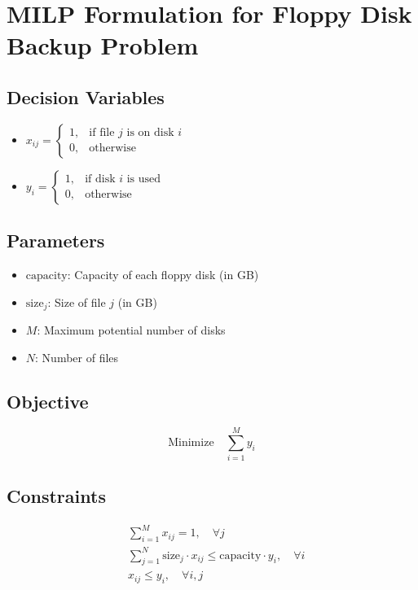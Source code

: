 \documentclass{article}
\begin{document}
\section*{MILP Formulation for Floppy Disk Backup Problem}

\subsection*{Decision Variables}
\begin{itemize}
    \item $x_{ij} = 
    \begin{cases} 
    1, & \text{if file } j \text{ is on disk } i \\
    0, & \text{otherwise}
    \end{cases}$
    
    \item $y_i =
    \begin{cases} 
    1, & \text{if disk } i \text{ is used} \\
    0, & \text{otherwise}
    \end{cases}$
\end{itemize}

\subsection*{Parameters}
\begin{itemize}
    \item $\text{capacity}$: Capacity of each floppy disk (in GB)
    \item $\text{size}_j$: Size of file $j$ (in GB)
    \item $M$: Maximum potential number of disks
    \item $N$: Number of files
\end{itemize}

\subsection*{Objective}
\[
\text{Minimize} \quad \sum_{i=1}^{M} y_i
\]

\subsection*{Constraints}
\begin{align}
    &\sum_{i=1}^{M} x_{ij} = 1, \quad \forall j \\
    &\sum_{j=1}^{N} \text{size}_j \cdot x_{ij} \leq \text{capacity} \cdot y_i, \quad \forall i \\
    &x_{ij} \leq y_i, \quad \forall i, j
\end{align}
\end{document}
